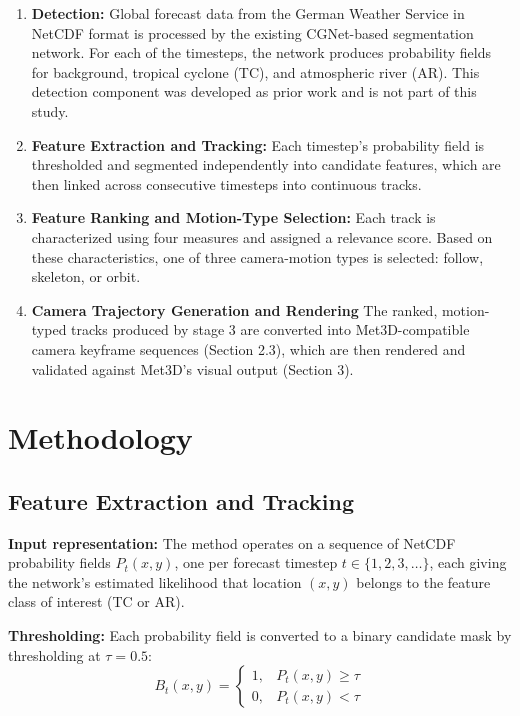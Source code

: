 \documentclass[journal abbreviation, manuscript]{copernicus}
\begin{document}
\begin{enumerate}
    \item \textbf{Detection:}
   Global forecast data from the German Weather Service in NetCDF format is processed by the existing CGNet-based segmentation network. For each of the timesteps, the network produces probability fields for background, tropical cyclone (TC), and atmospheric river (AR). This detection component was developed as prior work and is not part of this study.

    \item \textbf{Feature Extraction and Tracking:}
    Each timestep's probability field is thresholded and segmented independently into candidate features, which are then linked across consecutive timesteps into continuous tracks.

    \item \textbf{Feature Ranking and Motion-Type Selection:}
   Each track is characterized using four measures and assigned a relevance score. Based on these characteristics, one of three camera-motion types is selected: follow, skeleton, or orbit.

    \item \textbf{Camera Trajectory Generation and Rendering}
    The ranked, motion-typed tracks produced by stage 3 are converted into Met3D-compatible camera keyframe sequences (Section 2.3), which are then rendered and validated against Met3D's visual output (Section 3).
    
\end{enumerate}

\section{Methodology}

\subsection{Feature Extraction and Tracking}

\textbf{Input representation:} The method operates on a sequence of NetCDF probability fields $P_t(x,y)$, one per forecast timestep $t \in \{1,2,3,\dots\}$, each giving the network's estimated likelihood that location $(x,y)$ belongs to the feature class of interest (TC or AR).

\textbf{Thresholding:} Each probability field is converted to a binary candidate mask by thresholding at $\tau = 0.5$:
\begin{equation}
B_t(x,y) =
\begin{cases}
1, & P_t(x,y) \geq \tau \\
0, & P_t(x,y) < \tau
\end{cases}
\tag{1}
\end{equation}
\end{document}
